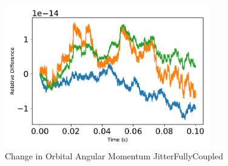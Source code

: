 \begin{figure}[htbp]\centerline{\includegraphics[width=0.8\textwidth]{AutoTeX/ChangeInOrbitalAngularMomentumJitterFullyCoupled}}\caption{Change in Orbital Angular Momentum JitterFullyCoupled}\label{fig:ChangeInOrbitalAngularMomentumJitterFullyCoupled}\end{figure}